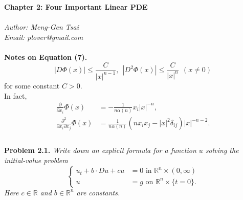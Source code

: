 \documentclass{article}
\begin{document}
\textbf{\Large Chapter 2: Four Important Linear PDE} \\\\



\emph{Author: Meng-Gen Tsai} \\
\emph{Email: plover@gmail.com} \\\\









\textbf{Notes on Equation (7).}
\[
  |D\Phi(x)| \leq \frac{C}{|x|^{n-1}}, \:\:
  |D^2\Phi(x)| \leq \frac{C}{|x|^{n}} \:\: (x \neq 0)
\]
for some constant $C > 0$. \\

In fact,
\begin{align*}
\frac{\partial}{\partial x_i}\Phi(x)
&= -\frac{1}{n\alpha(n)} x_i |x|^{-n}, \\
\frac{\partial^2}{\partial x_i \partial x_j}\Phi(x)
&= \frac{1}{n\alpha(n)} (n x_i x_j - |x|^2 \delta_{ij}) |x|^{-n-2}. \\\\
\end{align*}






\textbf{Problem 2.1.}
\emph{Write down an explicit formula for a function $u$ solving
the initial-value problem
\begin{equation*}
  \begin{cases}
    u_t + b \cdot Du + cu &= 0 \text{ in } \mathbb{R}^n \times (0,\infty) \\
    u                     &= g \text{ on } \mathbb{R}^n \times \{ t=0 \}.
  \end{cases}
\end{equation*}
Here $c \in \mathbb{R}$ and $b \in \mathbb{R}^n$ are constants.} \\
\end{document}
